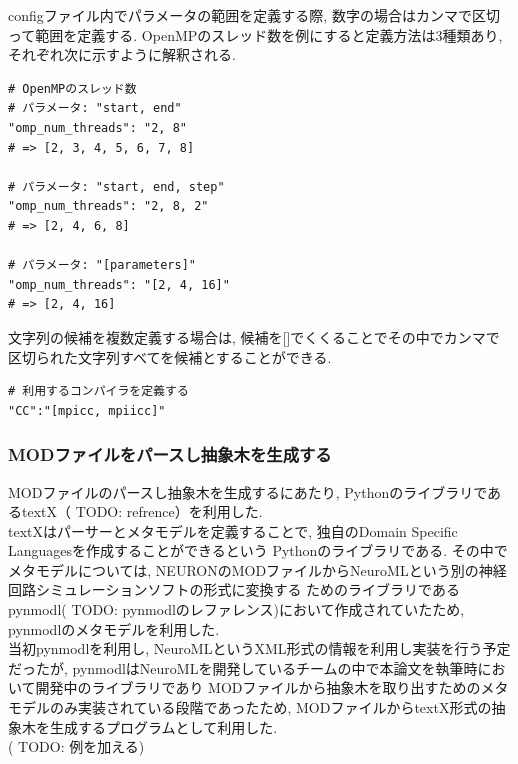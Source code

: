 configファイル内でパラメータの範囲を定義する際, 数字の場合はカンマで区切って範囲を定義する.
OpenMPのスレッド数を例にすると定義方法は3種類あり, それぞれ次に示すように解釈される.\\
{\footnotesize
\begin{lstlisting}[numbers=none, caption=数値パラメータの定義]
# OpenMPのスレッド数
# パラメータ: "start, end"
"omp_num_threads": "2, 8"
# => [2, 3, 4, 5, 6, 7, 8]

# パラメータ: "start, end, step"
"omp_num_threads": "2, 8, 2"
# => [2, 4, 6, 8]

# パラメータ: "[parameters]"
"omp_num_threads": "[2, 4, 16]"
# => [2, 4, 16]
\end{lstlisting}
}

文字列の候補を複数定義する場合は,
候補を[]でくくることでその中でカンマで区切られた文字列すべてを候補とすることができる.
{\footnotesize
\begin{lstlisting}[numbers=none, caption=文字列パラメータの定義]
# 利用するコンパイラを定義する
"CC":"[mpicc, mpiicc]"

\end{lstlisting}
}
\subsubsection{MODファイルをパースし抽象木を生成する}
\label{sec:simulator-mod-parse}
MODファイルのパースし抽象木を生成するにあたり, PythonのライブラリであるtextX（ TODO: refrence）を利用した.\\
textXはパーサーとメタモデルを定義することで, 独自のDomain Specific Languagesを作成することができるという
Pythonのライブラリである.
その中でメタモデルについては, NEURONのMODファイルからNeuroMLという別の神経回路シミュレーションソフトの形式に変換する
ためのライブラリであるpynmodl( TODO: pynmodlのレファレンス)において作成されていたため, pynmodlのメタモデルを利用した.\\
当初pynmodlを利用し, NeuroMLというXML形式の情報を利用し実装を行う予定だったが,
pynmodlはNeuroMLを開発しているチームの中で本論文を執筆時において開発中のライブラリであり
MODファイルから抽象木を取り出すためのメタモデルのみ実装されている段階であったため,
MODファイルからtextX形式の抽象木を生成するプログラムとして利用した.\\

( TODO: 例を加える)

